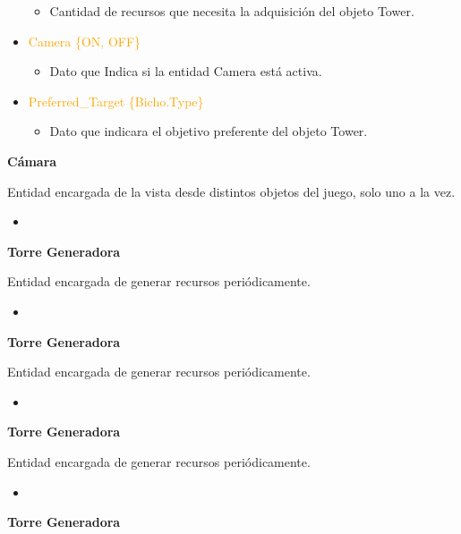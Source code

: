 \documentclass{article}
\begin{document}
\begin{itemize}
\begin{itemize}
        \item Cantidad de recursos que necesita la adquisición del objeto Tower.
    \end{itemize}
    \item \textcolor{Orange}{Camera \{ON, OFF\}}
    \begin{itemize}
        \item Dato que Indica si la entidad Camera está activa.
    \end{itemize}
    \item \textcolor{Orange}{Preferred\_Target \{Bicho.Type\}}
    \begin{itemize}
        \item Dato que indicara el objetivo preferente del objeto Tower.
    \end{itemize}
\end{itemize}

\noindent \textbf{Cámara}

\hfill \break \noindent Entidad encargada de la vista desde distintos objetos del juego, solo uno a la vez.

\begin{itemize}
    \item 
\end{itemize}

\noindent \textbf{Torre Generadora}

\hfill \break \noindent Entidad encargada de generar recursos periódicamente.

\begin{itemize}
    \item 
\end{itemize}

\noindent \textbf{Torre Generadora}

\hfill \break \noindent Entidad encargada de generar recursos periódicamente.

\begin{itemize}
    \item 
\end{itemize}

\noindent \textbf{Torre Generadora}

\hfill \break \noindent Entidad encargada de generar recursos periódicamente.

\begin{itemize}
    \item 
\end{itemize}

\noindent \textbf{Torre Generadora}
\end{document}
